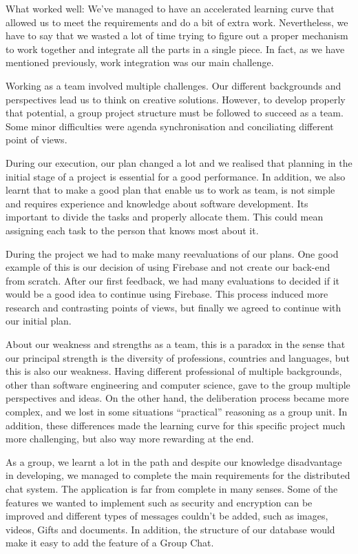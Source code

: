 What worked well: We've managed to have an accelerated learning curve that allowed us to meet the requirements and do a bit of extra work. Nevertheless, we have  to say that we wasted a lot of time trying to figure out a proper mechanism to work together and integrate all the parts in a single piece. In fact, as we have mentioned previously, work integration was our main challenge. 

Working as a team involved multiple challenges. Our different backgrounds and perspectives lead us to think on creative solutions. However, to develop properly that potential, a group project structure must be followed to succeed as a team. Some minor difficulties were agenda synchronisation and conciliating different point of views.

During our execution, our plan changed a lot and we realised that planning in the initial stage of a project is essential for a good performance. In addition, we also learnt that to make a good plan that enable us to work as team, is not simple and requires experience and knowledge about software development. Its important to divide the tasks and properly allocate them. This could mean assigning each task to the person that knows most about it.

During the project we had to make many reevaluations of our plans. One good example of this is our decision of using Firebase and not create our back-end from scratch. After our first feedback, we had many evaluations to decided if it would be a good idea to continue using Firebase. This process induced more research and contrasting points of views, but finally we agreed to continue with our initial plan.

About our weakness and strengths as a team, this is a paradox in the sense that our principal strength is the diversity of professions, countries and languages, but this is also our weakness. Having different professional of multiple backgrounds, other than software engineering and computer science, gave to the group multiple perspectives and ideas. On the other hand, the deliberation process became more complex, and we lost in some situations “practical” reasoning as a group unit. In addition, these differences made the learning curve for this specific project much more challenging, but also way more rewarding at the end. 

As a group, we learnt a lot in the path and despite our knowledge disadvantage in developing, we managed to complete the main requirements for the distributed chat system. The application is far from complete in many senses. Some of the features we wanted to implement such as security and encryption can be improved and different types of messages couldn't be added, such as images, videos, Gifts and documents. In addition, the structure of our database would make it easy to add the feature of a Group Chat. 


